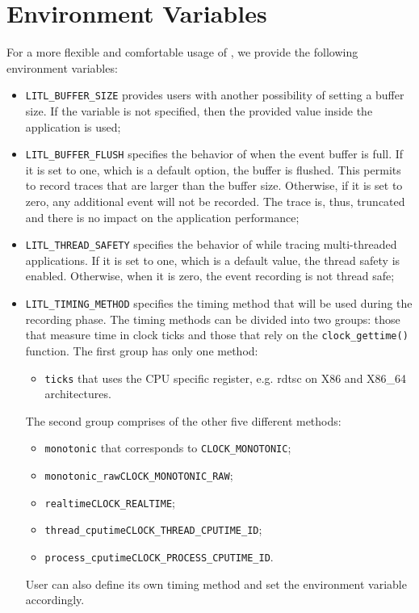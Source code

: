 \section{Environment Variables}
For a more flexible and comfortable usage of \litl{}, we provide the following 
environment variables:
\begin{itemize}
 \item \texttt{LITL\_BUFFER\_SIZE} provides users with another possibility of 
       setting a buffer size. If the variable is not specified, then the provided 
       value inside the application is used;
       
 \item \texttt{LITL\_BUFFER\_FLUSH} specifies the behavior of \litl{} when the 
       event buffer is full. If it is set to one, which is a default option, 
       the buffer is flushed. This permits to record traces that are larger 
       than the buffer size. Otherwise, if it is set to zero, any additional 
       event will not be recorded. The trace is, thus, truncated and there is no 
       impact on the application performance;

 \item \texttt{LITL\_THREAD\_SAFETY} specifies the behavior of \litl{} while
       tracing multi-threaded applications. If it is set to one, which is a 
       default value, the thread safety is enabled. Otherwise, when it is zero, 
       the event recording is not thread safe;
 
 \item \texttt{LITL\_TIMING\_METHOD} specifies the timing method that will be 
       used during the recording phase. The \litl{} timing methods can be 
       divided into two groups: those that measure time in clock ticks and 
       those that rely on the \texttt{clock\_gettime()} function. The first 
       group has only one method:
       \begin{itemize}
        \item \texttt{ticks} that uses the CPU specific register, e.g. rdtsc 
        on X86 and X86\_64 architectures.
       \end{itemize}     
       The second group comprises of the other five different methods:
       \begin{itemize}
        \item \texttt{monotonic} that corresponds to \texttt{CLOCK\_MONOTONIC};
        \item \texttt{monotonic\_raw}\dash{}\texttt{CLOCK\_MONOTONIC\_RAW};
        \item \texttt{realtime}\dash{}\texttt{CLOCK\_REALTIME};
        \item \texttt{thread\_cputime}\dash{}\texttt{CLOCK\_THREAD\_CPUTIME\_ID};        
        \item \texttt{process\_cputime}\dash{}\texttt{CLOCK\_PROCESS\_CPUTIME\_ID}.
       \end{itemize}
       User can also define its own timing method and set the environment 
       variable accordingly.
\end{itemize}


